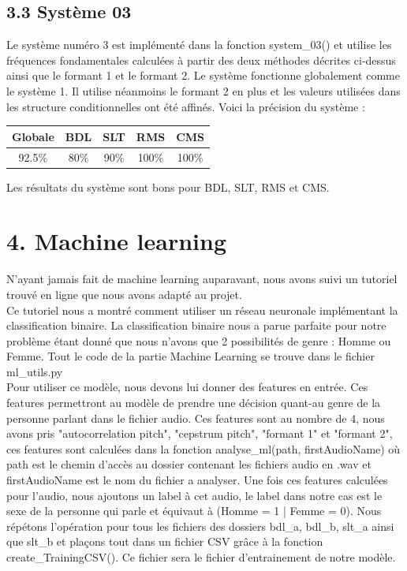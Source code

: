 \documentclass[a4paper,12pt]{report}	%
\begin{document}
{\subsection*{3.3 Système 03}}
Le système numéro 3 est implémenté dans la fonction system\_03() et utilise les fréquences fondamentales calculées à partir des deux méthodes décrites ci-dessus ainsi que le formant 1 et le formant 2. Le système fonctionne globalement comme le système 1. Il utilise néanmoins le formant 2 en plus et les valeurs utilisées dans les structure conditionnelles ont été affinés. Voici la précision du système : \\
\begin{center}
	\begin{tabular}{|c|c|c|c|c|}
		\hline
		Globale & BDL & SLT & RMS & CMS \\
		\hline
		92.5\% & 80\% & 90\% & 100\% & 100\% \\
		\hline
	\end{tabular}
\end{center}
Les résultats du système sont bons pour BDL, SLT, RMS et CMS.
{\section*{4. Machine learning}}
N'ayant jamais fait de machine learning auparavant, nous avons suivi un tutoriel trouvé en ligne que nous avons adapté au projet. \\
Ce tutoriel nous a montré comment utiliser un réseau neuronale implémentant la classification binaire. La classification binaire nous a parue parfaite pour notre problème étant donné que nous n'avons que 2 possibilités de genre : Homme ou Femme. Tout le code de la partie Machine Learning se trouve dans le fichier ml\_utils.py\\
Pour utiliser ce modèle, nous devons lui donner des features en entrée. Ces features permettront au modèle de prendre une décision quant-au genre de la personne parlant dans le fichier audio. Ces features sont au nombre de 4, nous avons pris "autocorrelation pitch", "cepstrum pitch", "formant 1" et "formant 2", ces features sont calculées dans la fonction analyse\_ml(path, firstAudioName) où path est le chemin d'accès au dossier contenant les fichiers audio en .wav et firstAudioName est le nom du fichier a analyser. Une fois ces features calculées pour l'audio, nous ajoutons un label à cet audio, le label dans notre cas est le sexe de la personne qui parle et équivaut à (Homme = 1 | Femme = 0). Nous répétons l'opération pour tous les fichiers des dossiers bdl\_a, bdl\_b, slt\_a ainsi que slt\_b et plaçons tout dans un fichier CSV grâce à la fonction create\_TrainingCSV(). Ce fichier sera le fichier d'entrainement de notre modèle.
\end{document}
